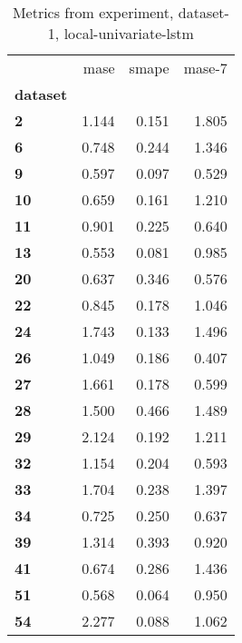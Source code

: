 \begin{table}[h]
\centering
\caption{Metrics from experiment, dataset-1, local-univariate-lstm}
\label{table:local-univariate-lstm-dataset-1}
\begin{tabular}{lrrr}
\toprule
{} &   mase &  smape &  mase-7 \\
\textbf{dataset} &        &        &         \\
\midrule
\textbf{2      } &  1.144 &  0.151 &   1.805 \\
\textbf{6      } &  0.748 &  0.244 &   1.346 \\
\textbf{9      } &  0.597 &  0.097 &   0.529 \\
\textbf{10     } &  0.659 &  0.161 &   1.210 \\
\textbf{11     } &  0.901 &  0.225 &   0.640 \\
\textbf{13     } &  0.553 &  0.081 &   0.985 \\
\textbf{20     } &  0.637 &  0.346 &   0.576 \\
\textbf{22     } &  0.845 &  0.178 &   1.046 \\
\textbf{24     } &  1.743 &  0.133 &   1.496 \\
\textbf{26     } &  1.049 &  0.186 &   0.407 \\
\textbf{27     } &  1.661 &  0.178 &   0.599 \\
\textbf{28     } &  1.500 &  0.466 &   1.489 \\
\textbf{29     } &  2.124 &  0.192 &   1.211 \\
\textbf{32     } &  1.154 &  0.204 &   0.593 \\
\textbf{33     } &  1.704 &  0.238 &   1.397 \\
\textbf{34     } &  0.725 &  0.250 &   0.637 \\
\textbf{39     } &  1.314 &  0.393 &   0.920 \\
\textbf{41     } &  0.674 &  0.286 &   1.436 \\
\textbf{51     } &  0.568 &  0.064 &   0.950 \\
\textbf{54     } &  2.277 &  0.088 &   1.062 \\
\bottomrule
\end{tabular}
\end{table}
